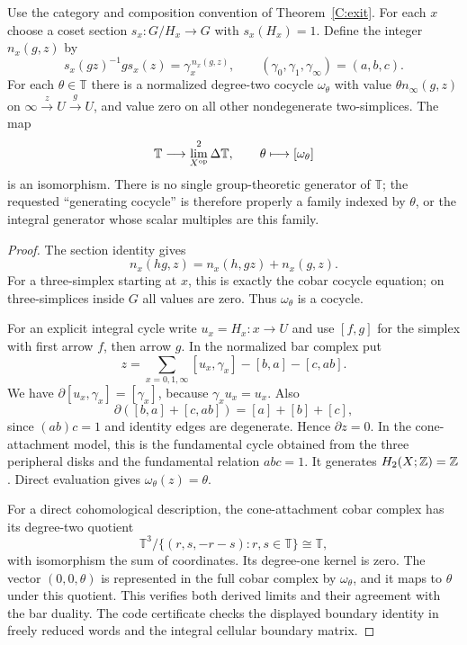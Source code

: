 \begin{proposition}\label{C:exit-cocycle}
Use the category and composition convention of Theorem~\ref{C:exit}. For each $x$ choose a coset section $s_x:G/H_x\to G$ with $s_x(H_x)=1$. Define the integer $n_x(g,z)$ by
\[
 s_x(gz)^{-1}g s_x(z)=\gamma_x^{\,n_x(g,z)},
 \qquad (\gamma_0,\gamma_1,\gamma_\infty)=(a,b,c).
\]
For each $\theta\in\mathbb T$ there is a normalized degree-two cocycle $\omega_\theta$ with value
$\theta n_\infty(g,z)$ on $\infty\xrightarrow zU\xrightarrow gU$, and value zero on all other nondegenerate two-simplices. The map
\[
 \mathbb T\longrightarrow\lim^2_{X^{\mathrm{op}}}\Delta\mathbb T,
 \qquad \theta\longmapsto[\omega_\theta]
\]
is an isomorphism. There is no single group-theoretic generator of $\mathbb T$; the requested ``generating cocycle'' is therefore properly a family indexed by $\theta$, or the integral generator whose scalar multiples are this family.
\end{proposition}
\begin{proof}
The section identity gives
\[
 n_x(hg,z)=n_x(h,gz)+n_x(g,z).
\]
For a three-simplex starting at $x$, this is exactly the cobar cocycle equation; on three-simplices inside $G$ all values are zero. Thus $\omega_\theta$ is a cocycle.

For an explicit integral cycle write $u_x=H_x:x\to U$ and use $[f,g]$ for the simplex with first arrow $f$, then arrow $g$. In the normalized bar complex put
\[
 z=\sum_{x=0,1,\infty}[u_x,\gamma_x]
       -[b,a]-[c,ab].
\]
We have $\partial[u_x,\gamma_x]=[\gamma_x]$, because $\gamma_xu_x=u_x$. Also
\[
 \partial([b,a]+[c,ab])=[a]+[b]+[c],
\]
since $(ab)c=1$ and identity edges are degenerate. Hence $\partial z=0$. In the cone-attachment model, this is the fundamental cycle obtained from the three peripheral disks and the fundamental relation $abc=1$. It generates $H_2(X;\mathbb Z)=\mathbb Z$. Direct evaluation gives $\omega_\theta(z)=\theta$.

For a direct cohomological description, the cone-attachment cobar complex has its degree-two quotient
\[
 \mathbb T^3/\{(r,s,-r-s):r,s\in\mathbb T\}\cong\mathbb T,
\]
with isomorphism the sum of coordinates. Its degree-one kernel is zero. The vector $(0,0,\theta)$ is represented in the full cobar complex by $\omega_\theta$, and it maps to $\theta$ under this quotient. This verifies both derived limits and their agreement with the bar duality. The code certificate checks the displayed boundary identity in freely reduced words and the integral cellular boundary matrix.
\end{proof}

